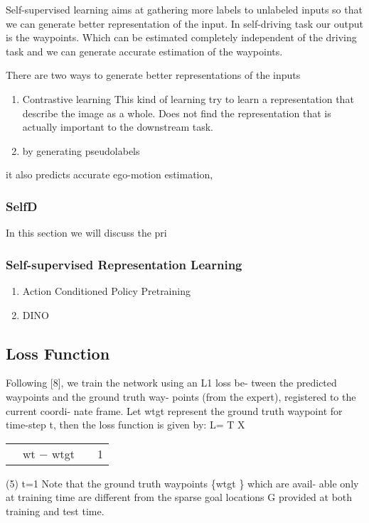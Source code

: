 \documentclass[letterpaper, 12pt]{article}
\theoremstyle{definition}
\theoremstyle{definition}
\theoremstyle{definition}
\theoremstyle{definition}
\theoremstyle{definition}
\begin{document}
Self-supervised learning aims at gathering more labels to unlabeled inputs so
that we can generate better representation of the input. In self-driving task
our output is the waypoints. Which can be estimated completely independent of
the driving task and we can generate accurate estimation of the waypoints.

There are two ways to generate better representations of the inputs
\begin{enumerate}
\item Contrastive learning
This kind of learning try to learn a representation that describe the image
as a whole. Does not find the representation that is actually important to
the downstream task.
\item by generating pseudolabels
\end{enumerate}


it also predicts
accurate ego-motion estimation, 
\subsubsection{SelfD}
\label{sec:org949ae87}
In this section we will discuss the pri
\subsubsection{Self-supervised Representation Learning}
\label{sec:orgea3b7ee}
\begin{enumerate}
\item Action Conditioned Policy Pretraining
\label{sec:org20fee42}
\item DINO
\label{sec:org9119f31}
\end{enumerate}
\subsection{Loss Function}
\label{sec:orgf3e20a4}
Following [8], we train the network using an L1 loss be-
tween the predicted waypoints and the ground truth way-
points (from the expert), registered to the current coordi-
nate frame. Let wtgt represent the ground truth waypoint for time-step t, then the loss function is given by:
L=
T
X
\begin{center}
\begin{tabular}{lllr}
 & wt − wtgt &  & 1\\
\end{tabular}
\end{center}
(5)
t=1
Note that the ground truth waypoints \{wtgt \} which are avail-
able only at training time are different from the sparse goal
locations G provided at both training and test time.
\end{document}
